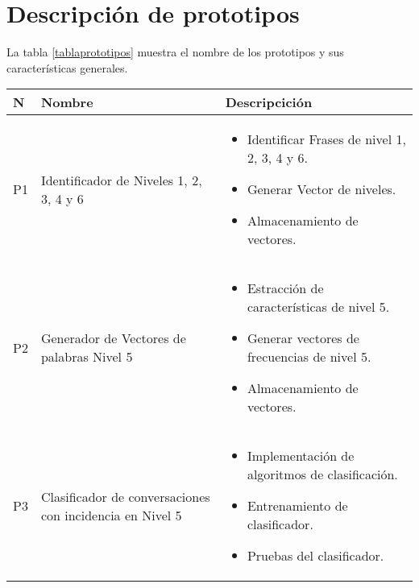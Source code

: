 \section{Descripci\'on de prototipos}

La tabla \ref{tablaprototipos} muestra el nombre de los prototipos y sus caracter\'isticas generales.



\begin{table}[h]

\begin{center}


\begin{tabular}{|l|p{45mm}|p{80mm}|}
\hline

N & Nombre & Descripcici\'on \\

\hline



P1 & Identificador de Niveles 1, 2, 3, 4 y 6 & \begin{itemize}
\item Identificar Frases de nivel 1, 2, 3, 4 y 6.
\item Generar Vector de niveles.
\item Almacenamiento de vectores.
\end{itemize} \\

\hline 

P2 & Generador de Vectores de palabras Nivel 5 & \begin{itemize}
\item Estracci\'on de caracter\'isticas de nivel 5.
\item Generar vectores de frecuencias de nivel 5.
\item Almacenamiento de vectores. 

\end{itemize} \\

\hline 


P3 & Clasificador de conversaciones con incidencia en Nivel 5 & \begin{itemize}
\item Implementaci\'on de algoritmos de clasificaci\'on.
\item Entrenamiento de clasificador.
\item Pruebas del clasificador.
\end{itemize} \\

\hline 




\end{tabular}
\end{center}
\end{table}
